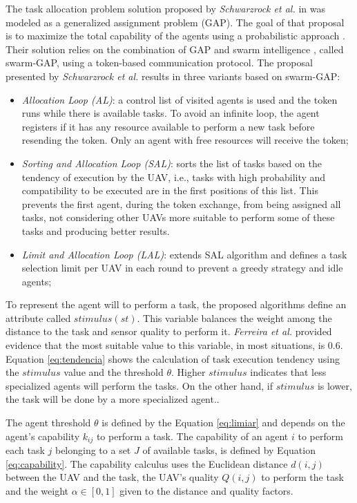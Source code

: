 The task allocation problem solution proposed by \textit{Schwarzrock et al.} in \cite{MAS07} was modeled as a generalized assignment problem (GAP)\cite{ferreira2007swarm}. The goal of that proposal is to maximize the total capability of the agents using a probabilistic approach \cite{theraulaz1998response}. Their solution relies on the combination of GAP and swarm intelligence \cite{MOEA07}, called swarm-GAP, using a token-based communication protocol. The proposal presented by \textit{Schwarzrock et al.}\cite{MAS07} results in three variants based on swarm-GAP:

\begin{itemize}
   \item \textit{Allocation Loop (AL)}: a control list of visited agents is used and the token runs while there is available tasks. To avoid an infinite loop, the agent registers if it has any resource available to perform a new task before resending the token. Only an agent with free resources will receive the token;
   \item \textit{Sorting and Allocation Loop (SAL)}: sorts the list of tasks based on the tendency of execution by the UAV, i.e., tasks with high probability and compatibility to be executed are in the first positions of this list. This prevents the first agent, during the token exchange, from being assigned all tasks, not considering other UAVs more suitable to perform some of these tasks and producing better results. 
   \item \textit{Limit and Allocation Loop (LAL)}: extends SAL algorithm and defines a task selection limit per UAV in each round to prevent a greedy strategy and idle agents;
\end{itemize}

To represent the agent will to perform a task, the proposed algorithms define an attribute called $stimulus (st)$. This variable balances the weight among the distance to the task and sensor quality to perform it. \textit{Ferreira et al.}\cite{ferreira2007swarm} provided evidence that the most suitable value to this variable, in most situations, is $0.6$. Equation \ref{eq:tendencia} shows the calculation of task execution tendency using the $stimulus$ value and the threshold $\theta$. Higher $stimulus$ indicates that less specialized agents will perform the tasks. On the other hand, if $stimulus$ is lower, the task will be done by a more specialized agent.\cite{bonabeau1999swarm}. 

The agent threshold $\theta$ is defined by the Equation \ref{eq:limiar} and depends on the agent's capability $k_{ij}$ to perform a task. The capability of an agent $i$ to perform each task $j$ belonging to a set $J$ of available tasks, is defined by Equation \ref{eq:capability}. The capability calculus uses the Euclidean distance $d(i,j)$ between the UAV and the task, the UAV's quality $Q(i,j)$ to perform the task and the weight $\alpha \in [0,1]$ given to the distance and quality factors. 

